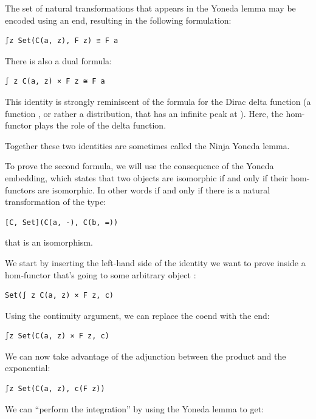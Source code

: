 The set of natural transformations that appears in the Yoneda lemma may
be encoded using an end, resulting in the following formulation:

\begin{verbatim}
∫z Set(C(a, z), F z) ≅ F a
\end{verbatim}

There is also a dual formula:

\begin{verbatim}
∫ z C(a, z) × F z ≅ F a
\end{verbatim}

This identity is strongly reminiscent of the formula for the Dirac delta
function (a function , or rather a distribution, that
has an infinite peak at ). Here, the hom-functor plays
the role of the delta function.

Together these two identities are sometimes called the Ninja Yoneda
lemma.

To prove the second formula, we will use the consequence of the Yoneda
embedding, which states that two objects are isomorphic if and only if
their hom-functors are isomorphic. In other words  if
and only if there is a natural transformation of the type:

\begin{verbatim}
[C, Set](C(a, -), C(b, =))
\end{verbatim}

that is an isomorphism.

We start by inserting the left-hand side of the identity we want to
prove inside a hom-functor that's going to some arbitrary object
:

\begin{verbatim}
Set(∫ z C(a, z) × F z, c)
\end{verbatim}

Using the continuity argument, we can replace the coend with the end:

\begin{verbatim}
∫z Set(C(a, z) × F z, c)
\end{verbatim}

We can now take advantage of the adjunction between the product and the
exponential:

\begin{verbatim}
∫z Set(C(a, z), c(F z))
\end{verbatim}

We can ``perform the integration'' by using the Yoneda lemma to get:

